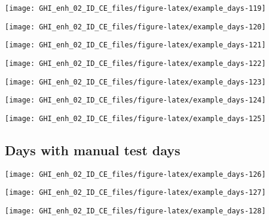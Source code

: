 \documentclass[
  10pt,
  a4paper,oneside]{article}
\begin{document}
\begin{center}\texttt{[image: GHI\_enh\_02\_ID\_CE\_files/figure-latex/example\_days-119]} \end{center}

\begin{center}\texttt{[image: GHI\_enh\_02\_ID\_CE\_files/figure-latex/example\_days-120]} \end{center}

\begin{center}\texttt{[image: GHI\_enh\_02\_ID\_CE\_files/figure-latex/example\_days-121]} \end{center}

\begin{center}\texttt{[image: GHI\_enh\_02\_ID\_CE\_files/figure-latex/example\_days-122]} \end{center}

\begin{center}\texttt{[image: GHI\_enh\_02\_ID\_CE\_files/figure-latex/example\_days-123]} \end{center}

\begin{center}\texttt{[image: GHI\_enh\_02\_ID\_CE\_files/figure-latex/example\_days-124]} \end{center}

\begin{center}\texttt{[image: GHI\_enh\_02\_ID\_CE\_files/figure-latex/example\_days-125]} \end{center}

\FloatBarrier

\hypertarget{days-with-manual-test-days}{%
\subsection{Days with manual test days}\label{days-with-manual-test-days}}

\begin{center}\texttt{[image: GHI\_enh\_02\_ID\_CE\_files/figure-latex/example\_days-126]} \end{center}

\begin{center}\texttt{[image: GHI\_enh\_02\_ID\_CE\_files/figure-latex/example\_days-127]} \end{center}

\begin{center}\texttt{[image: GHI\_enh\_02\_ID\_CE\_files/figure-latex/example\_days-128]} \end{center}
\end{document}
